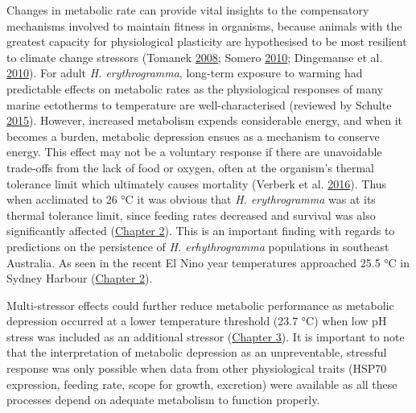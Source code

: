 \documentclass[a4paper,10pt, oneside]{memoir}
\begin{document}
Changes in metabolic rate can provide vital insights to the compensatory mechanisms involved to maintain fitness in organisms, because animals with the greatest capacity for physiological plasticity are hypothesised to be most resilient to climate change stressors (Tomanek \protect\hyperlink{ref-Tomanek2008}{2008}; Somero \protect\hyperlink{ref-Somero2010}{2010}; Dingemanse et al. \protect\hyperlink{ref-Dingemanse2010}{2010}).
For adult \emph{H. erythrogramma}, long-term exposure to warming had predictable effects on metabolic rates as the physiological responses of many marine ectotherms to temperature are well-characterised (reviewed by Schulte \protect\hyperlink{ref-Schulte2015}{2015}).
However, increased metabolism expends considerable energy, and when it becomes a burden, metabolic depression ensues as a mechanism to conserve energy.
This effect may not be a voluntary response if there are unavoidable trade-offs from the lack of food or oxygen, often at the organism's thermal tolerance limit which ultimately causes mortality (Verberk et al. \protect\hyperlink{ref-Verberk2016}{2016}).
Thus when acclimated to 26 °C it was obvious that \emph{H. erythrogramma} was at its thermal tolerance limit, since feeding rates decreased and survival was also significantly affected (\protect\hyperlink{warming}{Chapter 2}).
This is an important finding with regards to predictions on the persistence of \emph{H. erhythrogramma} populations in southeast Australia.
As seen in the recent El Nino year temperatures approached 25.5 °C in Sydney Harbour (\protect\hyperlink{warming}{Chapter 2}).

Multi-stressor effects could further reduce metabolic performance as metabolic depression occurred at a lower temperature threshold (23.7 °C) when low pH stress was included as an additional stressor (\protect\hyperlink{multistressor}{Chapter 3}).
It is important to note that the interpretation of metabolic depression as an unpreventable, stressful response was only possible when data from other physiological traits (HSP70 expression, feeding rate, scope for growth, excretion) were available as all these processes depend on adequate metabolism to function properly.
\end{document}
